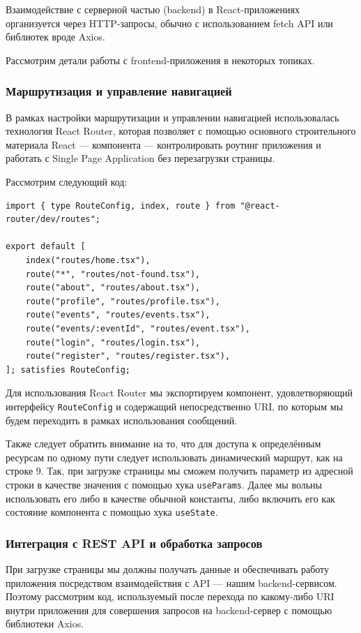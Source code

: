 \documentclass[diploma]{SCWorks}
\begin{document}
Взаимодействие с серверной частью (backend) в React-приложениях организуется 
через HTTP-запросы, обычно с использованием fetch API или библиотек вроде 
Axios.

Рассмотрим детали работы с frontend-приложения в некоторых топиках.

\subsubsection{Маршрутизация и управление навигацией}

В рамках настройки маршрутизации и управлении навигацией использовалась 
технология React Router, которая позволяет с помощью основного строительного
материала React — компонента — контролировать роутинг приложения и работать
с Single Page Application без перезагрузки страницы.

Рассмотрим следующий код:
\begin{verbatim}
import { type RouteConfig, index, route } from "@react-router/dev/routes";

export default [
    index("routes/home.tsx"),
    route("*", "routes/not-found.tsx"),
    route("about", "routes/about.tsx"),
    route("profile", "routes/profile.tsx"),
    route("events", "routes/events.tsx"),
    route("events/:eventId", "routes/event.tsx"),
    route("login", "routes/login.tsx"),
    route("register", "routes/register.tsx"),
]; satisfies RouteConfig;
\end{verbatim}
Для использования React Router мы экспортируем компонент, удовлетворяющий
интерфейсу \texttt{RouteConfig} и содержащий непосредственно URI, по которым 
мы будем переходить в рамках использования сообщений.

Также следует обратить внимание на то, что для доступа к определённым ресурсам
по одному пути следует использовать динамический маршрут, как на строке 9. Так,
при загрузке страницы мы сможем получить параметр из адресной строки в качестве
значения с помощью хука \texttt{useParams}. Далее мы вольны использовать его 
либо в качестве обычной константы, либо включить его как состояние компонента
с помощью хука \texttt{useState}.

\subsubsection{Интеграция с REST API и обработка запросов}

При загрузке страницы мы должны получать данные и обеспечивать работу 
приложения посредством взаимодействия с API ­— нашим backend-сервисом. Поэтому
рассмотрим код, используемый после перехода по какому-либо URI внутри 
приложения для совершения запросов на backend-сервер с помощью библиотеки 
Axios. 
\end{document}

